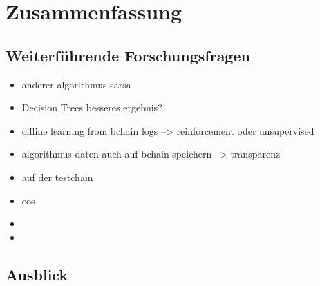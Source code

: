 \chapter{Zusammenfassung}
\label{kap:Kapitel05}
%
\section{Weiterf\"uhrende Forschungsfragen}
%
\begin{itemize}
    \item anderer algorithmus sarsa
    \item Decision Trees besseres ergebnis?
    \item offline learning from bchain logs --> reinforcement oder unsupervised
    \item algorithmus daten auch auf bchain speichern --> transparenz
    \item auf der testchain 
    \item eos
    \item 
    \item 
\end{itemize}
%
\section{Ausblick}
%

%
